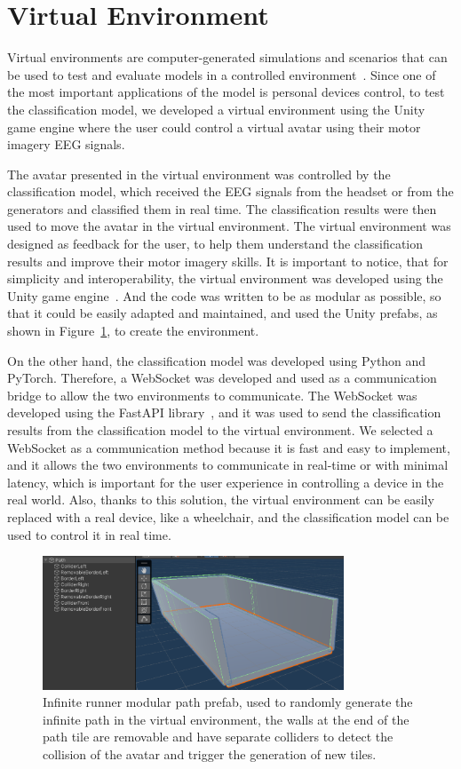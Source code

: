 \section{Virtual Environment}
Virtual environments are computer-generated simulations and scenarios that can be used to test and evaluate models in a controlled environment~\cite{ellis1994virtual}.
Since one of the most important applications of the model is personal devices control, to test the classification model, we developed a virtual environment using the Unity game engine where the user could control a virtual avatar using their motor imagery EEG signals.

The avatar presented in the virtual environment was controlled by the classification model, which received the EEG signals from the headset or from the generators and classified them in real time.
The classification results were then used to move the avatar in the virtual environment.
The virtual environment was designed as feedback for the user, to help them understand the classification results and improve their motor imagery skills.
It is important to notice, that for simplicity and interoperability, the virtual environment was developed using the Unity game engine~\cite{haas2014history}.
And the code was written to be as modular as possible, so that it could be easily adapted and maintained, and used the Unity prefabs, as shown in Figure~\ref{fig:path_prefab}, to create the environment.

On the other hand, the classification model was developed using Python and PyTorch.
Therefore, a WebSocket was developed and used as a communication bridge to allow the two environments to communicate.
The WebSocket was developed using the FastAPI library~\cite{noauthor_tiangolofastapi_nodate}, and it was used to send the classification results from the classification model to the virtual environment.
We selected a WebSocket as a communication method because it is fast and easy to implement, and it allows the two environments to communicate in real-time or with minimal latency, which is important for the user experience in controlling a device in the real world.
Also, thanks to this solution, the virtual environment can be easily replaced with a real device, like a wheelchair, and the classification model can be used to control it in real time.
\begin{figure}
    \centering
    \includegraphics[width=0.8\textwidth]{Figures/Approach/path_prefab}
    \caption{Infinite runner modular path prefab, used to randomly generate the infinite path in the virtual environment, the walls at the end of the path tile are removable and have separate colliders to detect the collision of the avatar and trigger the generation of new tiles.}\label{fig:path_prefab}
\end{figure}

